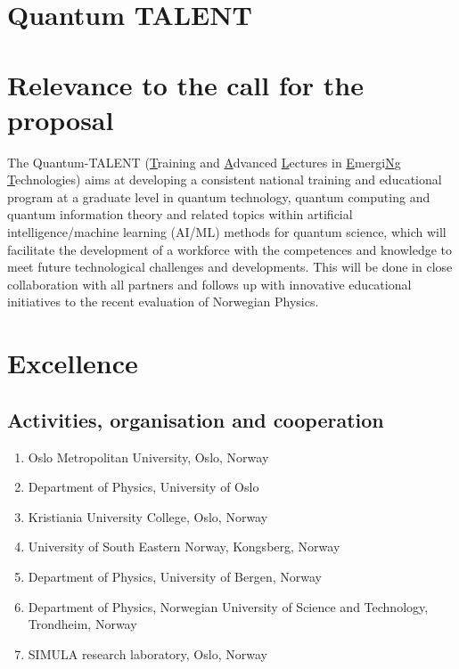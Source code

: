 \documentclass{scrreprt}
\author{Oslo Metropolitan University}
\date{\today}
\title{}
\begin{document}
\section*{\LARGE{Quantum TALENT}}





\section{Relevance to the call for the proposal}

The Quantum-TALENT (\underline{T}raining and \underline{A}dvanced
\underline{L}ectures in \underline{E}mergi\underline{N}g
\underline{T}echnologies) aims at developing a consistent national training and
educational program at a graduate  level in quantum technology, quantum
computing and quantum information theory and related topics within  artificial
intelligence/machine learning (AI/ML) methods for quantum science,
which will facilitate the development of a workforce with the
competences and knowledge to meet future technological challenges and
developments. This will  be done in close collaboration with all
partners and follows up with innovative educational initiatives  to the recent evaluation of Norwegian Physics.


\section{Excellence}

\subsection{Activities, organisation and cooperation}

\begin{enumerate}

\item Oslo Metropolitan University, Oslo, Norway

\item Department of Physics, University of Oslo

\item Kristiania University College, Oslo, Norway

\item University of South Eastern Norway, Kongsberg, Norway


\item Department of Physics, University of Bergen, Norway

\item Department of Physics, Norwegian University of Science and Technology, Trondheim, Norway

\item SIMULA research laboratory, Oslo, Norway

\end{enumerate}
\end{document}
